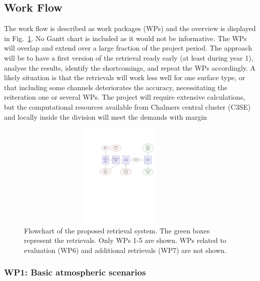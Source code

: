 \documentclass[12pt,oneside,a4paper]{article}
\begin{document}
\subsection{Work Flow}
\label{sec:wp}


The work flow is described as work packages (WPs) and the overview is displayed
in Fig.~\ref{fig:flowchart}. No Gantt chart is included as it would not be
informative. The WPs will overlap and extend over a large fraction of the project
period. The approach will be to have a first version of the retrieval ready early (at least during year 1), analyse the results, identify the shortcomings, and repeat the WPs accordingly. A likely situation is that the retrievals will work less well for one surface type, or that including some channels deteriorates the accuracy, necessitating the reiteration one or several WPs. The project will require extensive calculations, but
the computational resources available from Chalmers central cluster
(C3SE) and locally inside the division will meet the demands with margin

\begin{figure}
	\begin{minipage}[c]{0.75\textwidth}
		\includegraphics[trim=100 400 15 125,clip,height = 50mm, width=100mm]{flowchart.pdf}
	\end{minipage}\hfill
	\begin{minipage}[c]{0.24\textwidth}
		\caption{Flowchart of the proposed retrieval system. The green boxes
          represent the retrievals. Only WPs 1-5 are shown. WPs related to evaluation (WP6) and additional retrievals (WP7) are not shown.
		} \label{fig:flowchart}
	\end{minipage}
\end{figure}

\vspace{-1ex}
\subsubsection*{WP1: Basic atmospheric scenarios}
%
\end{document}
